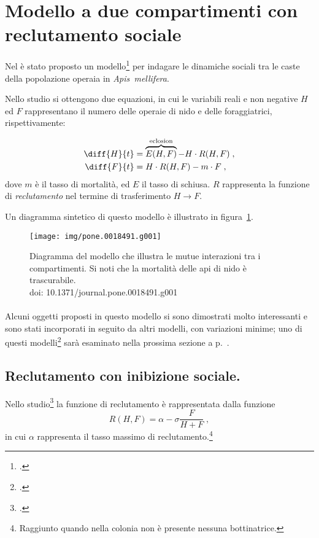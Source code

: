 \section[Modello a due compartimenti con reclutamento]{Modello a due compartimenti con reclutamento sociale}
\label{sec:kh11}

Nel \citeyear{khoury2011} è stato proposto un modello\footcite{khoury2011} per indagare le dinamiche sociali
tra le caste della popolazione operaia in \emph{Apis~mellifera}.

Nello studio si ottengono due equazioni, in cui le variabili reali e non negative $H$ ed $F$ rappresentano
il numero delle operaie di nido e delle foraggiatrici, rispettivamente:

\begin{align}
    \diff{H}{t} &= \overbrace{E(H,F)}^{\text{eclosion}}- H \cdot R(H,F) \label{eq:kh11h} \; , \\
    \diff{F}{t} &= H \cdot R(H,F)  - m \cdot F \label{eq:kh11f} \; ,
\end{align}
dove $m$ è il tasso di mortalità, ed $E$ il tasso di schiusa.
$R$ rappresenta la funzione di \emph{reclutamento} nel termine di
trasferimento $H \to F$.

Un diagramma sintetico di questo modello è illustrato in figura~\ref{img:kh11diagram}.

\begin{figure}[hbp]
    \centering
    \texttt{[image: img/pone.0018491.g001]}

    \caption[\figurename~1 da \parencite{khoury2011}]{Diagramma del modello che illustra le mutue interazioni
        tra i compartimenti. Si noti che la mortalità delle api di nido è trascurabile.
        \\
        { \footnotesize \ttfamily doi: 10.1371/journal.pone.0018491.g001 }
        }
    \label{img:kh11diagram}
\end{figure}


\paragraph{}
Alcuni oggetti proposti in questo modello si sono dimostrati molto interessanti e sono stati incorporati
in seguito da altri modelli, con variazioni minime;
uno di questi modelli\footcite{ratti2017} sarà esaminato nella prossima sezione a p.~\pageref{sec:ratti17}.


\subsection{Reclutamento con inibizione sociale.}
Nello studio\footcite{khoury2011} la funzione di reclutamento è rappresentata dalla funzione
\begin{equation}
    \label{eq:Recr}
    R(H,F) = \alpha - \sigma \frac{F}{H+F} \; ,
\end{equation}
in cui $\alpha$ rappresenta il tasso massimo di reclutamento.\footnote{Raggiunto quando nella colonia non è
presente nessuna bottinatrice.}

